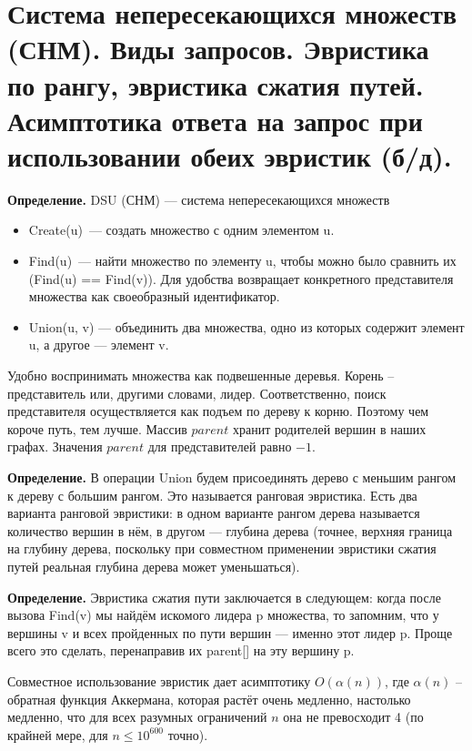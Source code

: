 \setcounter{section}{59}
\section{Система непересекающихся множеств (СНМ). Виды запросов. Эвристика по рангу, эвристика
сжатия путей. Асимптотика ответа на запрос при использовании обеих эвристик (б/д).}

\textbf{Определение.} DSU (СНМ) --- система непересекающихся множеств 
\begin{itemize}
    \item Create(u)~--- создать множество с одним элементом u.
    \item Find(u)~--- найти множество по элементу u, чтобы можно было сравнить их (Find(u) == Find(v)). Для удобства возвращает конкретного представителя множества как своеобразный идентификатор.
    \item Union(u, v) --- объединить два множества, одно из которых содержит элемент u, а другое --- элемент v.
\end{itemize}

Удобно воспринимать множества как подвешенные деревья. Корень -- представитель или, другими словами, лидер. Соответственно, поиск представителя осуществляется как подъем по дереву к корню. Поэтому чем короче путь, тем лучше. Массив $parent$ хранит родителей вершин в наших графах. Значения $parent$ для представителей равно $-1$.

\textbf{Определение.} В операции Union будем присоединять дерево с меньшим рангом к дереву с большим рангом. Это называется ранговая эвристика. Есть два варианта ранговой эвристики: в одном варианте рангом дерева называется количество вершин в нём, в другом — глубина дерева (точнее, верхняя граница на глубину дерева, поскольку при совместном применении эвристики сжатия путей реальная глубина дерева может уменьшаться).

\textbf{Определение.} Эвристика сжатия пути заключается в следующем: когда после вызова {\rm Find}(v) мы найдём искомого лидера p множества, то запомним, что у вершины v и всех пройденных по пути вершин --- именно этот лидер p. Проще всего это сделать, перенаправив их {\rm parent}[] на эту вершину p.

Совместное использование эвристик дает асимптотику $O(\alpha(n))$, где $\alpha(n)$ -- обратная функция Аккермана, которая растёт очень медленно, настолько медленно, что для всех разумных ограничений $n$ она не превосходит 4 (по крайней мере, для $n \leq 10^{600}$ точно).

